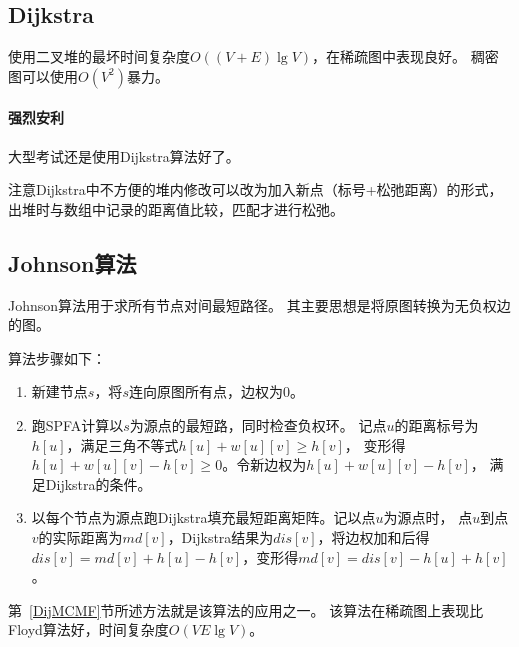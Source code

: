 \subsection{Dijkstra}
使用二叉堆的最坏时间复杂度$O((V+E)\lg V)$，在稀疏图中表现良好。
稠密图可以使用$O(V^2)$暴力。
\paragraph{强烈安利}
大型考试还是使用Dijkstra算法好了。

注意Dijkstra中不方便的堆内修改可以改为加入新点（标号+松弛距离）的形式，
出堆时与数组中记录的距离值比较，匹配才进行松弛。
\subsection{Johnson算法}
Johnson算法用于求所有节点对间最短路径。
其主要思想是将原图转换为无负权边的图。

算法步骤如下：
\begin{enumerate}
    \item 新建节点$s$，将$s$连向原图所有点，边权为0。
    \item 跑SPFA计算以$s$为源点的最短路，同时检查负权环。
    记点$u$的距离标号为$h[u]$，满足三角不等式$h[u]+w[u][v]\geq h[v]$，
    变形得$h[u]+w[u][v]-h[v]\geq 0$。令新边权为$h[u]+w[u][v]-h[v]$，
    满足Dijkstra的条件。
    \item 以每个节点为源点跑Dijkstra填充最短距离矩阵。记以点$u$为源点时，
    点$u$到点$v$的实际距离为$md[v]$，Dijkstra结果为$dis[v]$，将边权加和后得
    $dis[v]=md[v]+h[u]-h[v]$，变形得$md[v]=dis[v]-h[u]+h[v]$。
\end{enumerate}

第~\ref{DijMCMF}节所述方法就是该算法的应用之一。
该算法在稀疏图上表现比Floyd算法好，时间复杂度$O(VE\lg V)$。
